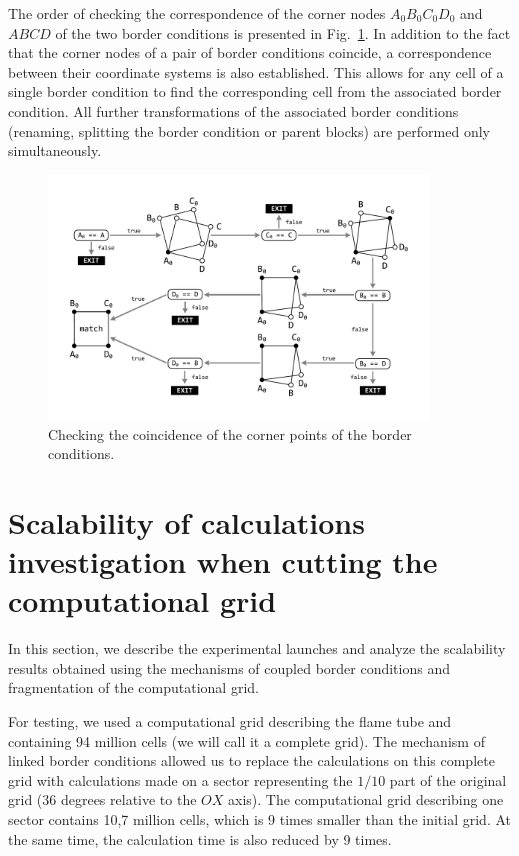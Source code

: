 \documentclass[
11pt,%
tightenlines,%
twoside,%
onecolumn,%
nofloats,%
nobibnotes,%
nofootinbib,%
superscriptaddress,%
noshowpacs,%
centertags]%
{revtex4}
\begin{document}
The order of checking the correspondence of the corner  nodes
$A_0B_0C_0D_0$ and $ABCD$ of the two border conditions is presented
in Fig.~\ref{fig:match2}. In addition to the fact that the corner
nodes of a pair of border conditions coincide, a correspondence
between their coordinate systems is also established. This allows
for any cell of a single border condition to find the corresponding
cell from the associated border condition. All further
transformations of the associated border conditions (renaming,
splitting the border condition or parent blocks) are performed only
simultaneously.

\begin{figure}[h]
\setcaptionmargin{5mm}
\onelinecaptionstrue
\includegraphics[width=0.9\textwidth]{pics/match2.pdf}
\caption{Checking the coincidence  of the
corner points of the border conditions.} \label{fig:match2}
\end{figure}

\section{Scalability of calculations investigation  when cutting the computational grid}

In this section, we describe the experimental launches and analyze
the scalability results obtained using the mechanisms of coupled
border conditions and fragmentation of the computational grid.

For testing, we used a computational grid describing the flame tube
and containing 94 million cells (we will call it a complete grid).
The mechanism of linked border conditions allowed us to replace the
calculations on this complete grid with calculations made on a
sector representing the $1/10$ part of the original grid (36 degrees
relative to the $OX$ axis). The computational grid describing one
sector contains 10,7 million cells, which is 9 times smaller than
the initial grid. At the same time, the calculation time is also
reduced by 9 times.
\end{document}
